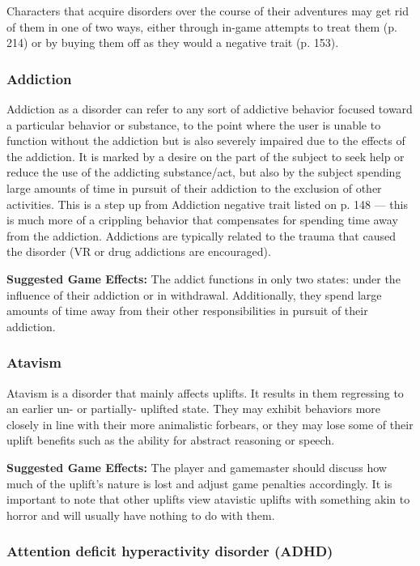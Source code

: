 Characters that acquire disorders over the course of their adventures may get rid of them in one of two ways, either through in-game attempts to treat them (p. 214) or by buying them off as they would a negative trait (p. 153).

\subsubsection{Addiction}

Addiction as a disorder can refer to any sort of addictive behavior focused toward a particular behavior or substance, to the point where the user is unable to function without the addiction but is also severely impaired due to the effects of the addiction. It is marked by a desire on the part of the subject to seek help or reduce the use of the addicting substance/act, but also by the subject spending large amounts of time in pursuit of their addiction to the exclusion of other activities. This is a step up from Addiction negative trait listed on p. 148 --- this is much more of a crippling behavior that compensates for spending time away from the addiction. Addictions are typically related to the trauma that caused the disorder (VR or drug addictions are encouraged).

\textbf{Suggested Game Effects:} The addict functions in only two states: under the influence of their addiction or in withdrawal. Additionally, they spend large amounts of time away from their other responsibilities in pursuit of their addiction.

\subsubsection{Atavism}

Atavism is a disorder that mainly affects uplifts. It results in them regressing to an earlier un- or partially- uplifted state. They may exhibit behaviors more closely in line with their more animalistic forbears, or they may lose some of their uplift benefits such as the ability for abstract reasoning or speech.

\textbf{Suggested Game Effects:} The player and gamemaster should discuss how much of the uplift’s nature is lost and adjust game penalties accordingly. It is important to note that other uplifts view atavistic uplifts with something akin to horror and will usually have nothing to do with them.

\subsubsection{Attention deficit hyperactivity disorder (ADHD)}

